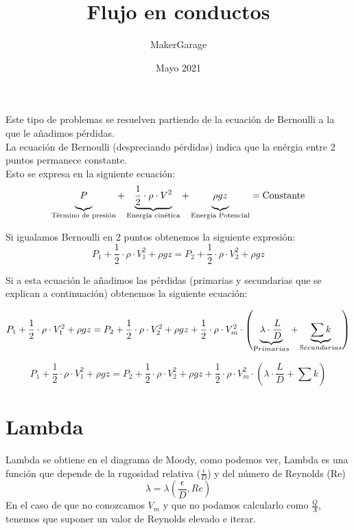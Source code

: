 \documentclass[10pt,a4paper]{article}
\title{Flujo en conductos}
\author{MakerGarage}
\date{Mayo 2021}
\begin{document}
\maketitle
\newpage
\tableofcontents
\newpage

Este tipo de problemas se resuelven partiendo de la ecuación de Bernoulli a la que le añadimos pérdidas.
\\

La ecuación de Bernoulli (despreciando pérdidas) indica que la enérgia entre 2 puntos permanece constante.
\\
Esto se expresa en la siguiente ecuación:
$$
\underbrace{\vphantom{\frac{}{}} P}_{\text{Término de presión}} + \underbrace{\frac{1}{2} \cdot \rho \cdot V^2}_{\text{Energía cinética}} + \underbrace{\vphantom{\frac{}{}}  \rho g z}_{\text{Energía Potencial}} = \text{Constante}
$$

Si igualamos Bernoulli en 2 puntos obtenemos la siguiente expresión:
$$
P_1 + \frac{1}{2} \cdot \rho \cdot V_{1}^2 + \rho g z = P_2 + \frac{1}{2} \cdot \rho \cdot V_{2}^2 + \rho g z 
$$

Si a esta ecuación le añadimos las pérdidas (primarias y secundarias que se explican a continuación) obtenemos la siguiente ecuación:

$$
P_1 + \frac{1}{2} \cdot \rho \cdot V_{1}^2 + \rho g z = P_2 + \frac{1}{2} \cdot \rho \cdot V_{2}^2 + \rho g z +  \frac{1}{2} \cdot \rho \cdot V_{m}^2 \cdot \left(\underbrace{\lambda \cdot \frac{L}{D}}_{\text Primarias} + \underbrace{\sum k}_{\text Secundarias} \right)
$$

\begin{center}
    \begin{tcolorbox}[colback=yellow!40!white, colframe=red!50!black,title=Ecuación de flujo en conductos]
    $$
        P_1 + \frac{1}{2} \cdot \rho \cdot V_{1}^2 + \rho g z = P_2 + \frac{1}{2} \cdot \rho \cdot V_{2}^2 + \rho g z +  \frac{1}{2} \cdot \rho \cdot V_{m}^2 \cdot \left(\lambda \cdot \frac{L}{D} + \sum k \right)
    $$
    \end{tcolorbox}
\end{center}

\newpage
\section{Lambda}
Lambda se obtiene en el diagrama de Moody, como podemos ver, Lambda es una función que depende de la rugosidad relativa ($\frac{\epsilon}{D}$) y del número de Reynolds (Re)
$$
\lambda = \lambda \left(\frac{\epsilon}{D},Re \right)
$$
En el caso de que no conozcamos $V_m$ y que no podamos calcularlo como $\frac{Q}{A}$, tenemos que suponer un valor de Reynolds elevado e iterar.
\\
\end{document}
